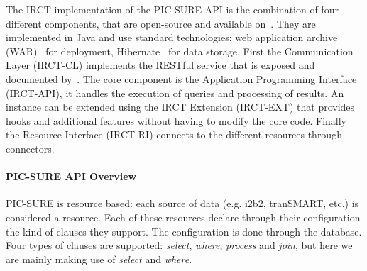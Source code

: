 
The IRCT implementation of the PIC-SURE API is the combination of four different components, that are open-source and available on~\cite{IRCT-github}. They are implemented in Java and use standard technologies: web application archive (WAR)~\cite{wiki:war} for deployment, Hibernate~\cite{wiki:hibernate} for data storage.
First the Communication Layer (IRCT-CL) implements the RESTful service that is exposed and documented by~\cite{PIC-SURE-API}. 
The core component is the Application Programming Interface (IRCT-API), it handles the execution of queries and processing of results.
An instance can be extended using the IRCT Extension (IRCT-EXT) that provides hooks and additional features without having to modify the core code.
Finally the Resource Interface (IRCT-RI) connects to the different resources through connectors.




\paragraph*{PIC-SURE API Overview}
PIC-SURE is resource based: each source of data (e.g. i2b2, tranSMART, etc.) is considered a resource.
Each of these resources declare through their configuration the kind of clauses they support. 
The configuration is done through the database.
Four types of clauses are supported: \emph{select}, \emph{where}, \emph{process} and \emph{join}, but here we are mainly making use of \emph{select} and \emph{where}.

